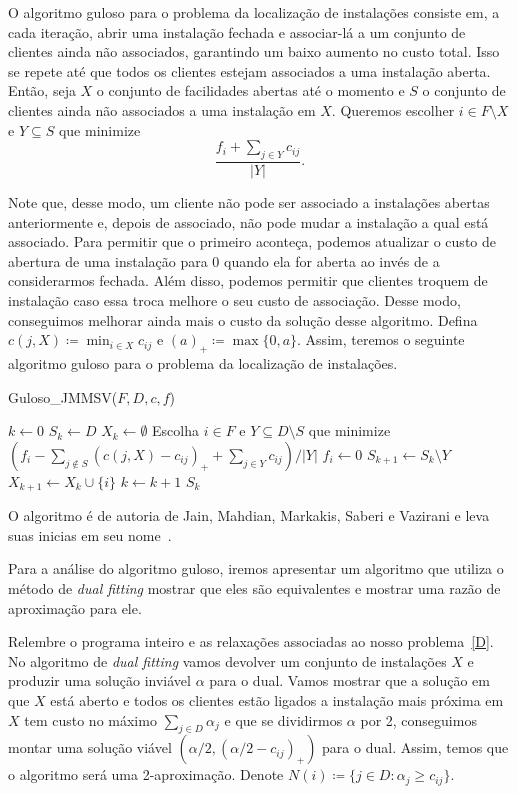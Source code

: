 O algoritmo guloso para o problema da localização de instalações consiste em, a cada iteração, abrir uma instalação fechada e associar-lá a um conjunto de clientes ainda não associados, garantindo um baixo aumento no custo total. 
Isso se repete até que todos os clientes estejam associados a uma instalação aberta. Então, seja $X$ o conjunto de facilidades abertas até o momento e $S$ o conjunto de clientes ainda não associados a uma instalação em $X$. Queremos escolher $i \in F \setminus X$ e $Y \subseteq S$ que minimize
\[ \frac{f_i + \sum_{j \in Y} c_{ij}}{|Y|}.
    \] 

Note que, desse modo, um cliente não pode ser associado a instalações abertas anteriormente e, depois de associado, não pode mudar a instalação a qual está associado. 
Para permitir que o primeiro aconteça, podemos atualizar o custo de abertura de uma instalação para 0 quando ela for aberta ao invés de a considerarmos fechada. Além disso, podemos permitir que clientes troquem de instalação caso essa troca melhore o seu custo de associação. Desse modo, conseguimos melhorar ainda mais o custo da solução desse algoritmo. Defina $c(j,X) \coloneq \min_{i \in X} c_{ij}$ e $(a)_+ \coloneq \max\{0,a\}$. Assim, teremos o seguinte algoritmo guloso para o problema da localização de instalações.
\begin{algorithm}
    \caption{Guloso\_JMMSV($F,D,c,f$)}
    \begin{algorithmic}[1]
        \State $k \gets 0$
        \State $S_k \gets D$
        \State $X_k \gets \emptyset$
        \State Escolha $i \in F$ e $Y \subseteq D\setminus S$ que minimize $(f_i - \sum_{j \not \in S}(c(j,X) - c_{ij})_+ + \sum_{j \in Y}c_{ij})/|Y|$
        \State $f_i \gets 0$
        \State $S_{k+1} \gets S_k \setminus Y$
        \State $X_{k+1} \gets X_k \cup \{i\}$
        \State $k \gets k+1$
        \EndWhile
        \State \Return $S_k$
    \end{algorithmic}
\end{algorithm}

O algoritmo é de autoria de Jain, Mahdian, Markakis, Saberi e Vazirani e leva suas inicias em seu nome~\cite{jain2002greedy}.

Para a análise do algoritmo guloso, iremos apresentar um algoritmo que utiliza o método de \emph{dual fitting} mostrar que eles são equivalentes e mostrar uma razão de aproximação para ele.

Relembre o programa inteiro e as relaxações associadas ao nosso problema~\ref{D}. No algoritmo de \emph{dual fitting} vamos devolver um conjunto de instalações $X$ e produzir uma solução inviável $\alpha$ para o dual. Vamos mostrar que a solução em que $X$ está aberto e todos os clientes estão ligados a instalação mais próxima em $X$ tem custo no máximo $\sum_{j \in D} \alpha_j$ e que se dividirmos $\alpha$ por 2, conseguimos montar uma solução viável $(\alpha/2,(\alpha/2 - c_{ij})_+)$ para o dual. Assim, temos que o algoritmo será uma 2-aproximação. Denote $N(i) \coloneqq \{j \in D: \alpha_j \geq c_{ij}\}$.

